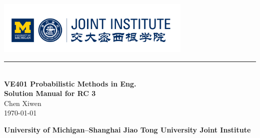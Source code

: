 \documentclass[12pt, a4paper]{article}
\newcommand{\HRule}{\rule{\linewidth}{0.5mm}}
\begin{document}
\renewcommand\arraystretch{1.5}
\setlength\parskip{.1\baselineskip}

\begin{titlepage}
  \begin{center}
  \includegraphics[width=0.7\textwidth]{./logo}\\
  \HRule\\[3cm]

  {\Huge\bfseries VE401 Probabilistic Methods in Eng.\\[0.5cm]Solution Manual for RC 3}\\[2cm]
  
  {\large Chen Xiwen}
  \\[1cm]
  {\large \today}
  \vfill

  \textbf{\small University of Michigan--Shanghai Jiao Tong University Joint Institute}
  \end{center}
\end{titlepage}


\newpage

\begin{spacing}{1.1}




  
\end{spacing}
\end{document}
